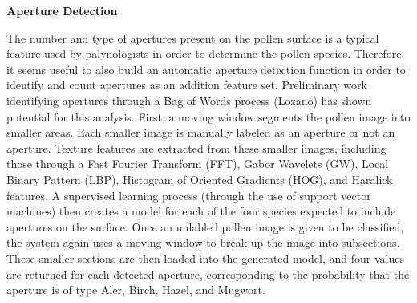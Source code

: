 \textbf{Aperture Detection}

The number and type of apertures present on the pollen surface is a typical feature used by palynologists in order to determine the pollen species. Therefore, it seems useful to also build an automatic aperture detection function in order to identify and count apertures as an addition feature set. Preliminary work identifying apertures through a Bag of Words process (Lozano) has shown potential for this analysis.
First, a moving window segments the pollen image into smaller areas. Each smaller image is manually labeled as an aperture or not an aperture. Texture features are extracted from these smaller images, including those through a Fast Fourier Transform (FFT), Gabor Wavelets (GW), Local Binary Pattern (LBP), Histogram of Oriented Gradients (HOG), and Haralick features. A supervised learning process (through the use of support vector machines) then creates a model for each of the four species expected to include apertures on the surface.
Once an unlabled pollen image is given to be classified, the system again uses a moving window to break up the image into subsections. These smaller sections are then loaded into the generated model, and four values are returned for each detected aperture, corresponding to the probability that the aperture is of type Aler, Birch, Hazel, and Mugwort. 

    
    
  
  